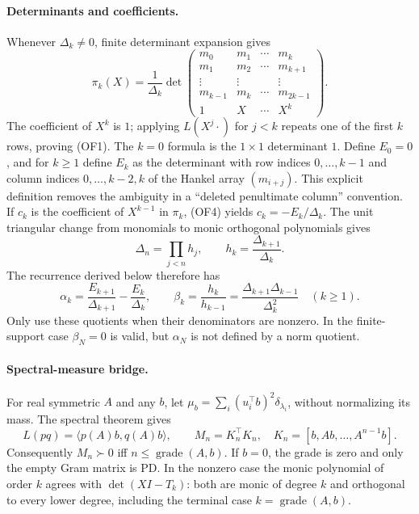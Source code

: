 \documentclass[11pt,a4paper]{article}
\theoremstyle{definition}
\begin{document}
\paragraph{Determinants and coefficients.}
Whenever $\Delta_k\ne0$, finite determinant expansion gives
\[
 \pi_k(X)=\frac1{\Delta_k}
 \det\begin{pmatrix}
 m_0&m_1&\cdots&m_k\\
 m_1&m_2&\cdots&m_{k+1}\\
 \vdots&\vdots&&\vdots\\
 m_{k-1}&m_k&\cdots&m_{2k-1}\\
 1&X&\cdots&X^k
 \end{pmatrix}.                                               \tag{OF4}
\]
The coefficient of $X^k$ is $1$; applying $L(X^j\cdot)$ for $j<k$
repeats one of the first $k$ rows, proving (OF1). The $k=0$ formula is
the $1\times1$ determinant $1$.
Define $E_0=0$, and for $k\ge1$ define $E_k$ as the determinant with row
indices $0,\ldots,k-1$ and column indices $0,\ldots,k-2,k$ of the Hankel
array $(m_{i+j})$. This explicit definition removes the ambiguity in a
``deleted penultimate column'' convention. If $c_k$ is the coefficient of
$X^{k-1}$ in $\pi_k$, (OF4) yields $c_k=-E_k/\Delta_k$.
The unit triangular change from monomials to monic orthogonal polynomials
gives
\[
 \Delta_n=\prod_{j<n}h_j,\qquad h_k=\frac{\Delta_{k+1}}{\Delta_k}.
                                                                    \tag{OF5}
\]
The recurrence derived below therefore has
\[
 \alpha_k=\frac{E_{k+1}}{\Delta_{k+1}}-\frac{E_k}{\Delta_k},\qquad
 \beta_k=\frac{h_k}{h_{k-1}}
        =\frac{\Delta_{k+1}\Delta_{k-1}}{\Delta_k^2}\quad(k\ge1). \tag{OF6}
\]
Only use these quotients when their denominators are nonzero. In the
finite-support case $\beta_N=0$ is valid, but $\alpha_N$ is not defined by
a norm quotient.

\paragraph{Spectral-measure bridge.}
For real symmetric $A$ and any $b$, let
$\mu_b=\sum_i(u_i^\top b)^2\delta_{\lambda_i}$, without normalizing its
mass. The spectral theorem gives
\[
 L(pq)=\langle p(A)b,q(A)b\rangle,\qquad
 M_n=K_n^\top K_n,\quad K_n=[b,Ab,\ldots,A^{n-1}b].             \tag{OF7}
\]
Consequently $M_n\succ0$ iff $n\le\operatorname{grade}(A,b)$.
If $b=0$, the grade is zero and only the empty Gram matrix is PD.
In the nonzero case the monic polynomial of order $k$ agrees with
$\det(XI-T_k)$: both are monic of degree $k$ and orthogonal to every lower
degree, including the terminal case $k=\operatorname{grade}(A,b)$.
\end{document}
